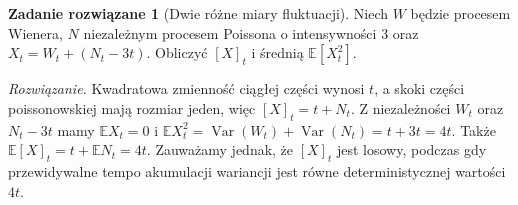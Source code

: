 \documentclass[11pt,a4paper,oneside]{report}
\numberwithin{equation}{chapter}
\theoremstyle{plain}
\theoremstyle{definition}
\newtheorem{zadanie}{Zadanie rozwiązane}[chapter]
\theoremstyle{remark}
\newcommand{\E}{\mathbb{E}}
\newcommand{\Var}{\operatorname{Var}}
\begin{document}
\begin{zadanie}[Dwie różne miary fluktuacji]
Niech $W$ będzie procesem Wienera, $N$ niezależnym
procesem Poissona o intensywności $3$ oraz
$X_t=W_t+(N_t-3t)$. Obliczyć $[X]_t$ i średnią
$\E[X_t^2]$.

\emph{Rozwiązanie.} Kwadratowa zmienność ciągłej części
wynosi $t$, a skoki części poissonowskiej mają rozmiar
jeden, więc $[X]_t=t+N_t$. Z niezależności
$W_t$ oraz $N_t-3t$ mamy
$\E X_t=0$ i
$\E X_t^2=\Var(W_t)+\Var(N_t)=t+3t=4t$.
Także $\E[X]_t=t+\E N_t=4t$.
Zauważamy jednak, że $[X]_t$ jest losowy, podczas
gdy przewidywalne tempo akumulacji wariancji jest
równe deterministycznej wartości $4t$.
\end{zadanie}
\end{document}
